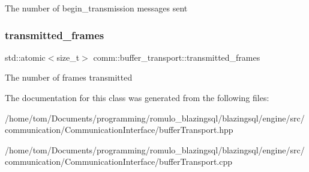 The number of begin\+\_\+transmission messages sent \mbox{\label{classcomm_1_1buffer__transport_a1c8254316bfcb05204a196bece986f68}} 
\subsubsection{\texorpdfstring{transmitted\+\_\+frames}{transmitted\_frames}}
{\footnotesize\ttfamily std\+::atomic$<$size\+\_\+t$>$ comm\+::buffer\+\_\+transport\+::transmitted\+\_\+frames\hspace{0.3cm}{\ttfamily [protected]}}

The number of frames transmitted 

The documentation for this class was generated from the following files\+:\begin{DoxyCompactItemize}
\item 
/home/tom/\+Documents/programming/romulo\+\_\+blazingsql/blazingsql/engine/src/communication/\+Communication\+Interface/buffer\+Transport.\+hpp\item 
/home/tom/\+Documents/programming/romulo\+\_\+blazingsql/blazingsql/engine/src/communication/\+Communication\+Interface/buffer\+Transport.\+cpp\end{DoxyCompactItemize}
